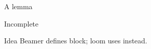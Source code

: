 \documentclass{beamer}
\begin{document}
\begin{frame}{A lemma}

\end{frame}
\begin{frame}{Incomplete}
\begin{block}{Idea}
Beamer defines block; loom uses \incomplete{} instead.
\end{block}
\end{frame}
\end{document}
